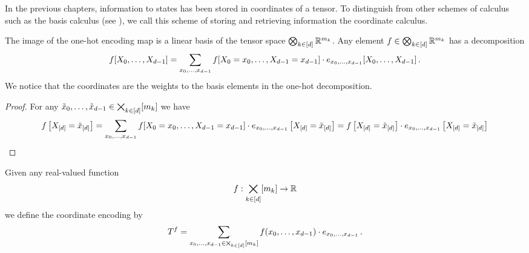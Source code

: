 \chapter{\chatextcoordinateCalculus} \label{cha:coordinateCalculus}

In the previous chapters, information to states has been stored in coordinates of a tensor.
To distinguish from other schemes of calculus such as the basis calculus (see ), we call this scheme of storing and retrieving information the coordinate calculus.


\begin{lemma}
    \label{lem:tensorBasisDecomposition}
    The image of the one-hot encoding map is a linear basis of the tensor space $\bigotimes_{k\in[d]} \mathbb{R}^{m_{k}}$.
    Any element $f\in\bigotimes_{k\in[d]} \mathbb{R}^{m_{k}}$ has a decomposition
    \[ f[X_{0},\ldots,X_{d-1}] = \sum_{x_{0},\ldots,x_{d-1}} f[X_{0}=x_{0},\ldots,X_{d-1}=x_{d-1}] \cdot e_{x_{0},\ldots,x_{d-1}}[X_{0},\ldots,X_{d-1}] \, . \]
    We notice that the coordinates are the weights to the basis elements in the one-hot decomposition.
\end{lemma}
\begin{proof}
    For any $\tilde{x}_{0},\ldots,\tilde{x}_{d-1}\in\bigtimes_{k\in[d]}[m_{k}]$ we have
    \[ f\left[X_{[d]}=\tilde{x}_{[d]}\right]
    = \sum_{x_{0},\ldots,x_{d-1}} f[X_{0}=x_{0},\ldots,X_{d-1}=x_{d-1}] \cdot e_{x_{0},\ldots,x_{d-1}}\left[X_{[d]}=\tilde{x}_{[d]}\right]
    = f\left[X_{[d]}=\tilde{x}_{[d]}\right] \cdot e_{x_{0},\ldots,x_{d-1}}\left[X_{[d]}=\tilde{x}_{[d]}\right]   \]
\end{proof}


\begin{definition}
    Given any real-valued function
    \[ f : \bigtimes_{k\in[d]}[m_{k}] \rightarrow \mathbb{R} \]
    we define the coordinate encoding by
    \[ T^{f} = \sum_{x_{0},\ldots,x_{d-1}\in\bigtimes_{k\in[d]}[m_{k}]} f(x_{0},\ldots,x_{d-1}) \cdot e_{x_{0},\ldots,x_{d-1}} \, . \]
\end{definition}


